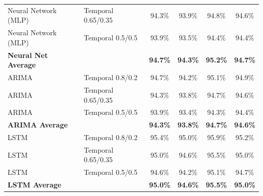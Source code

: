 \documentclass[11pt,a4paper]{article}
\begin{document}
\begin{table}[H]
\begin{tabular}{llcccc}
Neural Network (MLP) & Temporal 0.65/0.35 & 94.3\% & 93.9\% & 94.8\% & 94.6\% \\
Neural Network (MLP) & Temporal 0.5/0.5 & 93.9\% & 93.5\% & 94.4\% & 94.4\% \\
\textbf{Neural Net Average} & & \textbf{94.7\%} & \textbf{94.3\%} & \textbf{95.2\%} & \textbf{94.7\%} \\
\midrule
ARIMA & Temporal 0.8/0.2 & 94.7\% & 94.2\% & 95.1\% & 94.9\% \\
ARIMA & Temporal 0.65/0.35 & 94.3\% & 93.8\% & 94.7\% & 94.6\% \\
ARIMA & Temporal 0.5/0.5 & 93.9\% & 93.4\% & 94.3\% & 94.4\% \\
\textbf{ARIMA Average} & & \textbf{94.3\%} & \textbf{93.8\%} & \textbf{94.7\%} & \textbf{94.6\%} \\
\midrule
LSTM & Temporal 0.8/0.2 & 95.4\% & 95.0\% & 95.9\% & 95.2\% \\
LSTM & Temporal 0.65/0.35 & 95.0\% & 94.6\% & 95.5\% & 95.0\% \\
LSTM & Temporal 0.5/0.5 & 94.6\% & 94.2\% & 95.1\% & 94.7\% \\
\textbf{LSTM Average} & & \textbf{95.0\%} & \textbf{94.6\%} & \textbf{95.5\%} & \textbf{95.0\%} \\
\bottomrule
\end{tabular}
\end{table}
\end{document}
